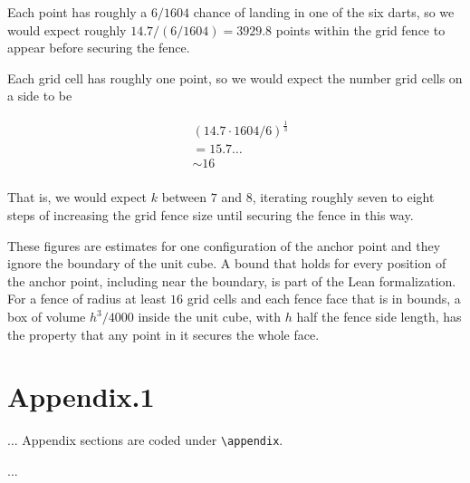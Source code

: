 \documentclass[a4paper,fleqn]{cas-dc}
\begin{document}
Each point has roughly a $6 / 1604$ chance of landing in one of the six darts, so we would expect
roughly $14.7 / (6 / 1604) = 3929.8$ points within the grid fence to appear before
securing the fence.

Each grid cell has roughly one point, so we would expect the number grid cells on a side to
be

$$
\begin{array}{ll}
  & (14.7 \cdot 1604 / 6)^{\frac{1}{3}} \\
  & = 15.7\ldots \\
  & \sim 16 \\
\end{array}
$$

That is, we would expect $k$ between $7$ and $8$, iterating roughly seven to eight steps of increasing the grid fence size
until securing the fence in this way.

These figures are estimates for one configuration of the anchor point and they ignore the boundary of the unit cube.
A bound that holds for every position of the anchor point, including near the boundary, is part of the Lean formalization.
For a fence of radius at least $16$ grid cells and each fence face that is in bounds,
a box of volume $h^3 / 4000$ inside the unit cube, with $h$ half the fence side length,
has the property that any point in it secures the whole face.


\section{Appendix.1}
...
Appendix sections are coded under \verb+\appendix+.

\printcredits

%






\bio{}
...
\endbio
\end{document}
